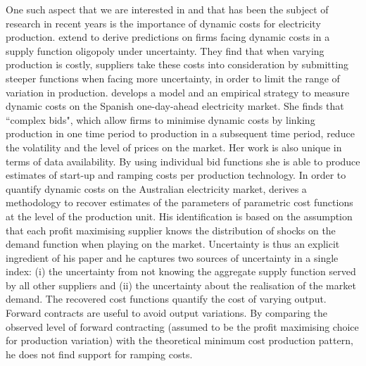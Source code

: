 One such aspect that we are interested in and that has been the subject of research in recent years is the importance of dynamic costs for electricity production. 
\cite{bergesmartimort2014} extend \cite{KM} to derive predictions on firms facing dynamic costs in a supply function oligopoly under uncertainty. 
They find that when varying production is costly, suppliers take these costs into consideration by submitting steeper functions when facing more uncertainty, in order to limit the range of variation in production.
\cite{reguant2011welfare} develops a model and an empirical strategy to measure dynamic costs on the Spanish one-day-ahead electricity market. She finds that ``complex bids", which allow firms to minimise dynamic costs by linking production in one time period to production in a subsequent time period, reduce the volatility and the level of prices on the market.  Her work is also unique in terms of data availability. By using individual bid functions she is able to produce estimates of start-up and ramping costs per production technology. 
In order to quantify dynamic costs on the Australian electricity market, \cite{wolak2007quantifying} derives a methodology to recover estimates of the parameters of parametric cost functions at the level of the production unit. His identification is based on the assumption that each profit maximising supplier knows the distribution of shocks on the demand function when playing on the market. Uncertainty is thus an explicit ingredient of his paper and he captures two sources of uncertainty in a single index: (i) the uncertainty from not knowing the aggregate supply function served by all other suppliers and (ii) the uncertainty about the realisation of the market demand.  The recovered cost functions quantify the cost of varying output. Forward contracts are useful to avoid output variations. By comparing the observed  level of forward contracting (assumed to be the profit maximising choice for production variation) with the theoretical minimum cost production pattern, he %
does not find support for ramping costs.

